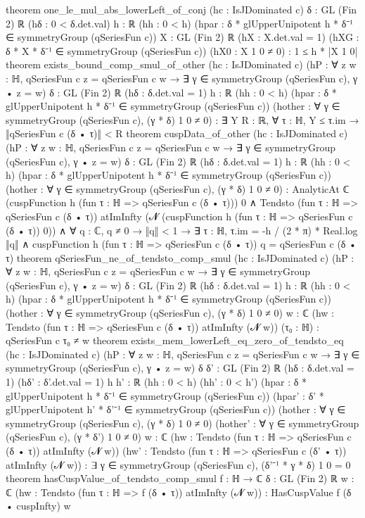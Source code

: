 \begin{leancode}
theorem one_le_mul_abs_lowerLeft_of_conj (hc : IsJDominated c) {δ : GL (Fin 2) ℝ}
    (hδ : 0 < δ.det.val) {h : ℝ} (hh : 0 < h)
    (hpar : δ * glUpperUnipotent h * δ⁻¹ ∈ symmetryGroup (qSeriesFun c)) {X : GL (Fin 2) ℝ}
    (hX : X.det.val = 1) (hXG : δ * X * δ⁻¹ ∈ symmetryGroup (qSeriesFun c))
    (hX0 : X 1 0 ≠ 0) : 1 ≤ h * |X 1 0|
theorem exists_bound_comp_smul_of_other (hc : IsJDominated c)
    (hP : ∀ z w : ℍ, qSeriesFun c z = qSeriesFun c w →
      ∃ γ ∈ symmetryGroup (qSeriesFun c), γ • z = w)
    {δ : GL (Fin 2) ℝ} (hδ : δ.det.val = 1) {h : ℝ} (hh : 0 < h)
    (hpar : δ * glUpperUnipotent h * δ⁻¹ ∈ symmetryGroup (qSeriesFun c))
    (hother : ∀ γ ∈ symmetryGroup (qSeriesFun c), (γ * δ) 1 0 ≠ 0) :
    ∃ Y R : ℝ, ∀ τ : ℍ, Y ≤ τ.im → ‖qSeriesFun c (δ • τ)‖ < R
theorem cuspData_of_other (hc : IsJDominated c)
    (hP : ∀ z w : ℍ, qSeriesFun c z = qSeriesFun c w →
      ∃ γ ∈ symmetryGroup (qSeriesFun c), γ • z = w)
    {δ : GL (Fin 2) ℝ} (hδ : δ.det.val = 1) {h : ℝ} (hh : 0 < h)
    (hpar : δ * glUpperUnipotent h * δ⁻¹ ∈ symmetryGroup (qSeriesFun c))
    (hother : ∀ γ ∈ symmetryGroup (qSeriesFun c), (γ * δ) 1 0 ≠ 0) :
    AnalyticAt ℂ (cuspFunction h (fun τ : ℍ => qSeriesFun c (δ • τ))) 0 ∧
      Tendsto (fun τ : ℍ => qSeriesFun c (δ • τ)) atImInfty
        (𝓝 (cuspFunction h (fun τ : ℍ => qSeriesFun c (δ • τ)) 0)) ∧
      ∀ q : ℂ, q ≠ 0 → ‖q‖ < 1 → ∃ τ : ℍ, τ.im = -h / (2 * π) * Real.log ‖q‖ ∧
        cuspFunction h (fun τ : ℍ => qSeriesFun c (δ • τ)) q = qSeriesFun c (δ • τ)
theorem qSeriesFun_ne_of_tendsto_comp_smul (hc : IsJDominated c)
    (hP : ∀ z w : ℍ, qSeriesFun c z = qSeriesFun c w →
      ∃ γ ∈ symmetryGroup (qSeriesFun c), γ • z = w)
    {δ : GL (Fin 2) ℝ} (hδ : δ.det.val = 1) {h : ℝ} (hh : 0 < h)
    (hpar : δ * glUpperUnipotent h * δ⁻¹ ∈ symmetryGroup (qSeriesFun c))
    (hother : ∀ γ ∈ symmetryGroup (qSeriesFun c), (γ * δ) 1 0 ≠ 0) {w : ℂ}
    (hw : Tendsto (fun τ : ℍ => qSeriesFun c (δ • τ)) atImInfty (𝓝 w)) (τ₀ : ℍ) :
    qSeriesFun c τ₀ ≠ w
theorem exists_mem_lowerLeft_eq_zero_of_tendsto_eq (hc : IsJDominated c)
    (hP : ∀ z w : ℍ, qSeriesFun c z = qSeriesFun c w →
      ∃ γ ∈ symmetryGroup (qSeriesFun c), γ • z = w)
    {δ δ' : GL (Fin 2) ℝ} (hδ : δ.det.val = 1) (hδ' : δ'.det.val = 1) {h h' : ℝ}
    (hh : 0 < h) (hh' : 0 < h')
    (hpar : δ * glUpperUnipotent h * δ⁻¹ ∈ symmetryGroup (qSeriesFun c))
    (hpar' : δ' * glUpperUnipotent h' * δ'⁻¹ ∈ symmetryGroup (qSeriesFun c))
    (hother : ∀ γ ∈ symmetryGroup (qSeriesFun c), (γ * δ) 1 0 ≠ 0)
    (hother' : ∀ γ ∈ symmetryGroup (qSeriesFun c), (γ * δ') 1 0 ≠ 0) {w : ℂ}
    (hw : Tendsto (fun τ : ℍ => qSeriesFun c (δ • τ)) atImInfty (𝓝 w))
    (hw' : Tendsto (fun τ : ℍ => qSeriesFun c (δ' • τ)) atImInfty (𝓝 w)) :
    ∃ γ ∈ symmetryGroup (qSeriesFun c), (δ'⁻¹ * γ * δ) 1 0 = 0
theorem hasCuspValue_of_tendsto_comp_smul {f : ℍ → ℂ} {δ : GL (Fin 2) ℝ} {w : ℂ}
    (hw : Tendsto (fun τ : ℍ => f (δ • τ)) atImInfty (𝓝 w)) :
    HasCuspValue f (δ • cuspInfty) w
\end{leancode}
